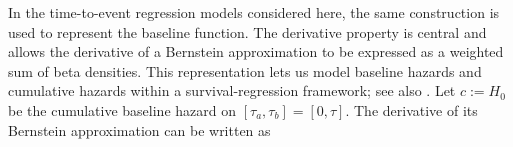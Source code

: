 \documentclass[5p,lefttitle]{elsarticle}
\begin{document}

In the time-to-event regression models considered here, the same
construction is used to represent the baseline function. The derivative
property is central and allows the derivative of a Bernstein
approximation to be expressed as a weighted sum of beta densities. This
representation lets us model baseline hazards and cumulative hazards
within a survival-regression framework; see also \citet{Osman:2012}. Let \(c:=H_0\) be the cumulative baseline hazard on
\([\tau_a,\tau_b]=[0,\tau]\). The derivative of its Bernstein
approximation can be written as
\end{document}
